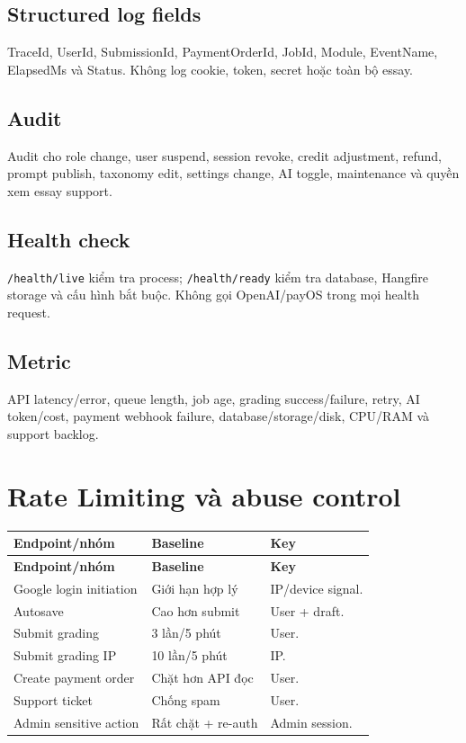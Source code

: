 \documentclass[11pt,a4paper]{article}
\begin{document}
\subsection{Structured log fields}
TraceId, UserId, SubmissionId, PaymentOrderId, JobId, Module, EventName, ElapsedMs và Status. Không log cookie, token, secret hoặc toàn bộ essay.

\subsection{Audit}
Audit cho role change, user suspend, session revoke, credit adjustment, refund, prompt publish, taxonomy edit, settings change, AI toggle, maintenance và quyền xem essay support.

\subsection{Health check}
\texttt{/health/live} kiểm tra process; \texttt{/health/ready} kiểm tra database, Hangfire storage và cấu hình bắt buộc. Không gọi OpenAI/payOS trong mọi health request.

\subsection{Metric}
API latency/error, queue length, job age, grading success/failure, retry, AI token/cost, payment webhook failure, database/storage/disk, CPU/RAM và support backlog.

\section{Rate Limiting và abuse control}

\begin{longtable}{|P{0.28\textwidth}|P{0.32\textwidth}|P{0.28\textwidth}|}
\hline
\textbf{Endpoint/nhóm} & \textbf{Baseline} & \textbf{Key} \\ \hline
\endfirsthead
\hline
\textbf{Endpoint/nhóm} & \textbf{Baseline} & \textbf{Key} \\ \hline
\endhead
Google login initiation & Giới hạn hợp lý & IP/device signal. \\ \hline
Autosave & Cao hơn submit & User + draft. \\ \hline
Submit grading & 3 lần/5 phút & User. \\ \hline
Submit grading IP & 10 lần/5 phút & IP. \\ \hline
Create payment order & Chặt hơn API đọc & User. \\ \hline
Support ticket & Chống spam & User. \\ \hline
Admin sensitive action & Rất chặt + re-auth & Admin session. \\ \hline
\end{longtable}
\end{document}
